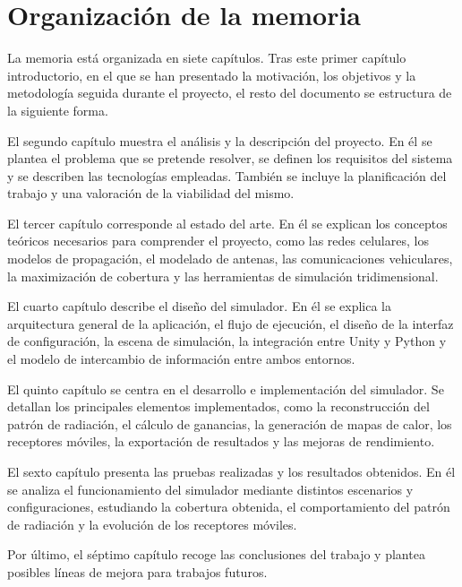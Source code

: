 \section{Organización de la memoria}

La memoria está organizada en siete capítulos. Tras este primer capítulo introductorio, en el que se han presentado la motivación, los objetivos y la metodología seguida durante el proyecto, el resto del documento se estructura de la siguiente forma.

El segundo capítulo muestra el análisis y la descripción del proyecto. En él se plantea el problema que se pretende resolver, se definen los requisitos del sistema y se describen las tecnologías empleadas. También se incluye la planificación del trabajo y una valoración de la viabilidad del mismo.

El tercer capítulo corresponde al estado del arte. En él se explican los conceptos teóricos necesarios para comprender el proyecto, como las redes celulares, los modelos de propagación, el modelado de antenas, las comunicaciones vehiculares, la maximización de cobertura y las herramientas de simulación tridimensional.

El cuarto capítulo describe el diseño del simulador. En él se explica la arquitectura general de la aplicación, el flujo de ejecución, el diseño de la interfaz de configuración, la escena de simulación, la integración entre Unity y Python y el modelo de intercambio de información entre ambos entornos.

El quinto capítulo se centra en el desarrollo e implementación del simulador. Se detallan los principales elementos implementados, como la reconstrucción del patrón de radiación, el cálculo de ganancias, la generación de mapas de calor, los receptores móviles, la exportación de resultados y las mejoras de rendimiento.

El sexto capítulo presenta las pruebas realizadas y los resultados obtenidos. En él se analiza el funcionamiento del simulador mediante distintos escenarios y configuraciones, estudiando la cobertura obtenida, el comportamiento del patrón de radiación y la evolución de los receptores móviles.

Por último, el séptimo capítulo recoge las conclusiones del trabajo y plantea posibles líneas de mejora para trabajos futuros.